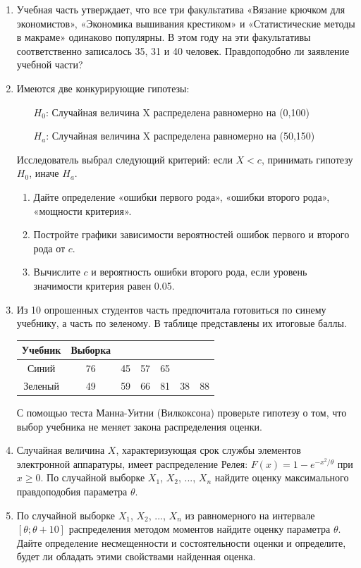 \documentclass[12pt, a4paper]{article}\usepackage[]{graphicx}\usepackage[]{color}
\begin{document}
\begin{enumerate}
\begin{enumerate}
\end{enumerate}
\item Учебная часть утверждает, что все три факультатива «Вязание крючком для экономистов», «Экономика вышивания крестиком» и «Статистические методы в макраме» одинаково популярны. В этом году на эти факультативы соответственно записалось 35, 31 и 40 человек. Правдоподобно ли заявление учебной части?
\item Имеются две конкурирующие гипотезы:
\begin{enumerate}
\item[$H_0$:] Случайная величина X распределена равномерно на (0,100)
\item[$H_a$:] Случайная величина X распределена равномерно на (50,150)
\end{enumerate}
Исследователь выбрал следующий критерий: если $X<c$, принимать гипотезу $H_0$, иначе  $H_a$.
\begin{enumerate}
\item Дайте определение «ошибки первого рода», «ошибки второго рода», «мощности критерия».
\item Постройте графики зависимости вероятностей ошибок первого и второго рода от $c$.
\item Вычислите $c$ и вероятность ошибки второго рода, если уровень значимости критерия равен 0.05.
\end{enumerate}
\item Из 10 опрошенных студентов часть предпочитала готовиться по синему учебнику, а часть по зеленому. В таблице представлены их итоговые баллы.


\begin{tabular}{c|cccccc}
Учебник & Выборка &  &  &   &   &   \\
\hline
Синий & 76 & 45 & 57 & 65 &   &   \\
Зеленый & 49 & 59 & 66 & 81 & 38 & 88 \\
\end{tabular}


С помощью теста Манна-Уитни (Вилкоксона) проверьте гипотезу о том, что выбор учебника не меняет закона распределения оценки.

\item Случайная величина $X$, характеризующая срок службы элементов электронной аппаратуры, имеет распределение Релея: $F(x)=1-e^{-x^2/\theta}$ при $x\geq 0$. По случайной выборке $X_1$, $X_2$, ..., $X_n$ найдите оценку максимального правдоподобия параметра $\theta$.

\item По случайной выборке $X_1$, $X_2$, ..., $X_n$ из равномерного на интервале $[\theta;\theta+10]$ распределения методом моментов найдите оценку параметра $\theta$. Дайте определение несмещенности и состоятельности оценки и определите, будет ли обладать этими свойствами найденная оценка.


\end{enumerate}
\end{document}
